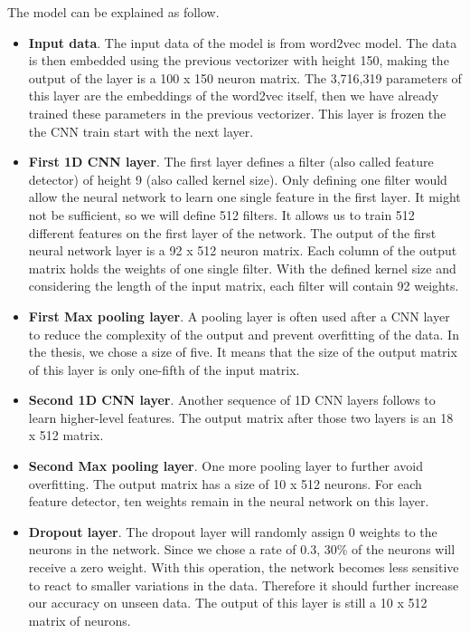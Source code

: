 The model can be explained as follow.
\begin{itemize}
	\item \textbf{Input data}. The input data of the model is from word2vec model. The data is then embedded using the previous vectorizer with height 150, making the output of the layer is a 100 x 150 neuron matrix. The 3,716,319 parameters of this layer are the embeddings of the word2vec itself, then we have already trained these parameters in the previous vectorizer. This layer is frozen the the CNN train start with the next layer.
	\item \textbf{First 1D CNN layer}. The first layer defines a filter (also called feature detector) of height 9 (also called kernel size). Only defining one filter would allow the neural network to learn one single feature in the first layer. It might not be sufficient, so we will define 512 filters. It allows us to train 512 different features on the first layer of the network. The output of the first neural network layer is a 92 x 512 neuron matrix. Each column of the output matrix holds the weights of one single filter. With the defined kernel size and considering the length of the input matrix, each filter will contain 92 weights. 
	\item \textbf{First Max pooling layer}. A pooling layer is often used after a CNN layer to reduce the complexity of the output and prevent overfitting of the data. In the thesis, we chose a size of five. It means that the size of the output matrix of this layer is only one-fifth of the input matrix. 
	\item \textbf{Second 1D CNN layer}. Another sequence of 1D CNN layers follows to learn higher-level features. The output matrix after those two layers is an 18 x 512 matrix. 
	\item \textbf{Second Max pooling layer}. One more pooling layer to further avoid overfitting. The output matrix has a size of 10 x 512 neurons. For each feature detector, ten weights remain in the neural network on this layer. 
	\item \textbf{Dropout layer}. The dropout layer will randomly assign 0 weights to the neurons in the network. Since we chose a rate of 0.3, 30\% of the neurons will receive a zero weight. With this operation, the network becomes less sensitive to react to smaller variations in the data. Therefore it should further increase our accuracy on unseen data. The output of this layer is still a 10 x 512 matrix of neurons. 

\end{itemize}
